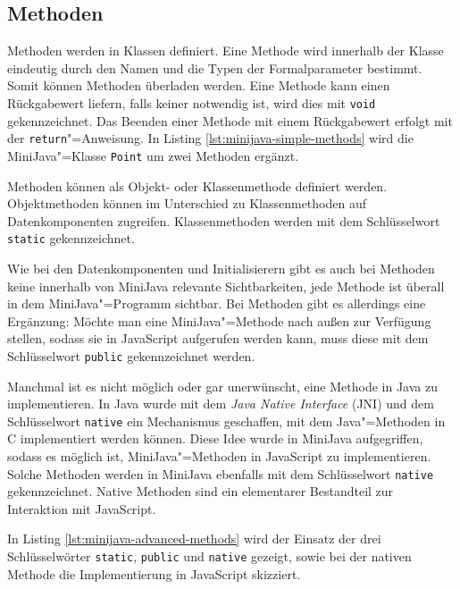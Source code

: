 \pagebreak
\subsection{Methoden}
\label{subsec:MiniJava-Methoden}

Methoden werden in Klassen definiert. Eine Methode wird innerhalb der Klasse eindeutig durch den Namen und die Typen der Formalparameter bestimmt. Somit können Methoden überladen werden. Eine Methode kann einen Rückgabewert liefern, falls keiner notwendig ist, wird dies mit \lstinline{void} gekennzeichnet. Das Beenden einer Methode mit einem Rückgabewert erfolgt mit der \lstinline{return}"=Anweisung. In Listing \ref{lst:minijava-simple-methods} wird die MiniJava"=Klasse \lstinline{Point} um zwei Methoden ergänzt.



Methoden können als Objekt- oder Klassenmethode definiert werden. Objektmethoden können im Unterschied zu Klassenmethoden auf Datenkomponenten zugreifen. Klassenmethoden werden mit dem Schlüsselwort \lstinline{static} gekennzeichnet.

Wie bei den Datenkomponenten und Initialisierern gibt es auch bei Methoden keine innerhalb von MiniJava relevante Sichtbarkeiten, jede Methode ist überall in dem MiniJava"=Programm sichtbar. Bei Methoden gibt es allerdings eine Ergänzung: Möchte man eine MiniJava"=Methode nach außen zur Verfügung stellen, sodass sie in JavaScript aufgerufen werden kann, muss diese mit dem Schlüsselwort \lstinline{public} gekennzeichnet werden.

Manchmal ist es nicht möglich oder gar unerwünscht, eine Methode in Java zu implementieren. In Java wurde mit dem \emph{Java Native Interface} (JNI) \cite{JNI8} und dem Schlüsselwort \lstinline{native} ein Mechanismus geschaffen, mit dem Java"=Methoden in C implementiert werden können. Diese Idee wurde in MiniJava aufgegriffen, sodass es möglich ist, MiniJava"=Methoden in JavaScript zu implementieren. Solche Methoden werden in MiniJava ebenfalls mit dem Schlüsselwort \lstinline{native} gekennzeichnet. Native Methoden sind ein elementarer Bestandteil zur Interaktion mit JavaScript.

In Listing \ref{lst:minijava-advanced-methods} wird der Einsatz der drei Schlüsselwörter \lstinline{static}, \lstinline{public} und \lstinline{native} gezeigt, sowie bei der nativen Methode die Implementierung in JavaScript skizziert.

